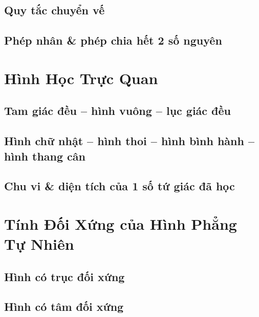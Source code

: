 \documentclass{article}
\numberwithin{equation}{section}
\begin{document}
\subsection{Quy tắc chuyển vế}

\subsection{Phép nhân \& phép chia hết 2 số nguyên}


\newpage
\section{Hình Học Trực Quan}

\subsection{Tam giác đều -- hình vuông -- lục giác đều}

\subsection{Hình chữ nhật -- hình thoi -- hình bình hành -- hình thang cân}

\subsection{Chu vi \& diện tích của 1 số tứ giác đã học}


\section{Tính Đối Xứng của Hình Phẳng Tự Nhiên}

\subsection{Hình có trục đối xứng}

\subsection{Hình có tâm đối xứng}

\end{document}
